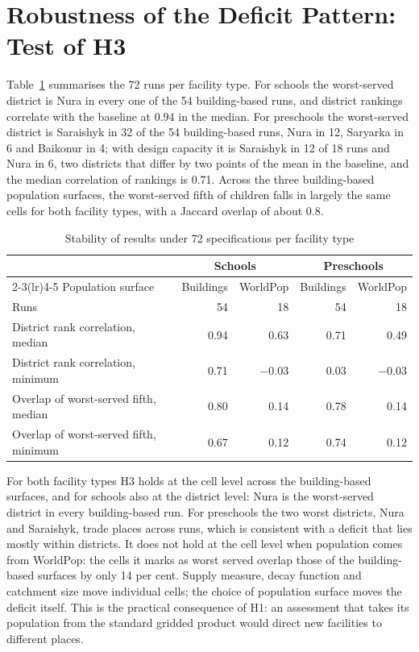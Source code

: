 \section{Robustness of the Deficit Pattern: Test of H3}
\label{sec:results-h3}

Table~\ref{tab:sensitivity} summarises the 72 runs per facility type. For schools the worst-served district is Nura in every one of the 54 building-based runs, and district rankings correlate with the baseline at 0.94 in the median. For preschools the worst-served district is Saraishyk in 32 of the 54 building-based runs, Nura in 12, Saryarka in 6 and Baikonur in 4; with design capacity it is Saraishyk in 12 of 18 runs and Nura in 6, two districts that differ by two points of the mean in the baseline, and the median correlation of rankings is 0.71. Across the three building-based population surfaces, the worst-served fifth of children falls in largely the same cells for both facility types, with a Jaccard overlap of about 0.8.

\begin{table}[ht]
\centering
\caption{Stability of results under 72 specifications per facility type}
\label{tab:sensitivity}
\small
\begin{tabular}{lrrrr}
\toprule
& \multicolumn{2}{c}{Schools} & \multicolumn{2}{c}{Preschools} \\
\cmidrule(lr){2-3}\cmidrule(lr){4-5}
Population surface & Buildings & WorldPop & Buildings & WorldPop \\
\midrule
Runs & 54 & 18 & 54 & 18 \\
District rank correlation, median & 0.94 & 0.63 & 0.71 & 0.49 \\
District rank correlation, minimum & 0.71 & $-0.03$ & 0.03 & $-0.03$ \\
Overlap of worst-served fifth, median & 0.80 & 0.14 & 0.78 & 0.14 \\
Overlap of worst-served fifth, minimum & 0.67 & 0.12 & 0.74 & 0.12 \\
\bottomrule
\end{tabular}
\end{table}

For both facility types H3 holds at the cell level across the building-based surfaces, and for schools also at the district level: Nura is the worst-served district in every building-based run. For preschools the two worst districts, Nura and Saraishyk, trade places across runs, which is consistent with a deficit that lies mostly within districts. It does not hold at the cell level when population comes from WorldPop: the cells it marks as worst served overlap those of the building-based surfaces by only 14 per cent. Supply measure, decay function and catchment size move individual cells; the choice of population surface moves the deficit itself. This is the practical consequence of H1: an assessment that takes its population from the standard gridded product would direct new facilities to different places.

